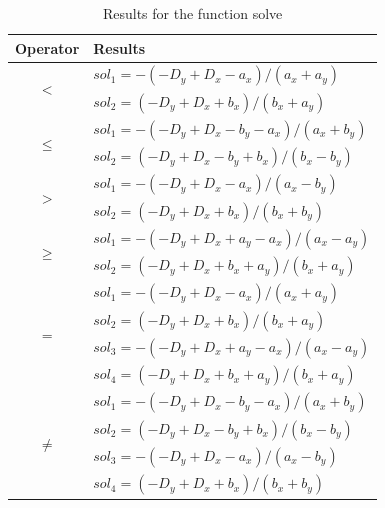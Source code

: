 \documentclass{llncs}
\begin{document}
\begin{table}
\centering
\caption{Results for the function solve}

\begin{tabular}{c l }
\hline
Operator & Results \\ \hline
\multirow{2}{*}{$<$} 
 & $sol_1 = -\left({-D_y+D_x-a_x}\right)/\left({a_x+a_y}\right)$ \\
 & $sol_2 = \left({-D_y+D_x+b_x}\right)/\left({b_x+a_y}\right)$ \\ \hline
\multirow{2}{*}{$\leq$}
 & $sol_1 = -\left({-D_y+D_x-b_y-a_x}\right)/\left({a_x+b_y}\right)$ \\
&  $sol_2 = \left({-D_y+D_x-b_y+b_x}\right)/\left({b_x-b_y}\right)$ \\ \hline
\multirow{2}{*}{$>$}
& $sol_1 = -\left({-D_y+D_x-a_x}\right)/\left({a_x-b_y}\right)$\\
& $sol_2 = \left({-D_y+D_x+b_x}\right)/\left({b_x+b_y}\right)$ \\ \hline
\multirow{2}{*}{$\geq$}
& $sol_1 = -\left({-D_y+D_x+a_y-a_x}\right)/\left({a_x-a_y}\right)$\\
& $sol_2 = \left({-D_y+D_x+b_x+a_y}\right)/\left({b_x+a_y}\right)$ \\
\multirow{4}{*}{$=$}
& $sol_1 = -\left({-D_y+D_x-a_x}\right)/\left({a_x+a_y}\right)$ \\
& $sol_2 = \left({-D_y+D_x+b_x}\right)/\left({b_x+a_y}\right)$ \\
& $sol_3 = -\left({-D_y+D_x+a_y-a_x}\right)/\left({a_x-a_y}\right)$ \\
& $sol_4 = \left({-D_y+D_x+b_x+a_y}\right)/\left({b_x+a_y}\right)$ \\ \hline
\multirow{4}{*}{$\neq$}
& $sol_1 = -\left({-D_y+D_x-b_y-a_x}\right)/\left({a_x+b_y}\right)$ \\
& $sol_2 = \left({-D_y+D_x-b_y+b_x}\right)/\left({b_x-b_y}\right)$ \\
& $sol_3 = -\left({-D_y+D_x-a_x}\right)/\left({a_x-b_y}\right)$ \\
& $sol_4 = \left({-D_y+D_x+b_x}\right)/\left({b_x+b_y}\right)$ \\
\hline 
\end{tabular}
\label{tbl:function-solve}



\end{table}

\end{document}
